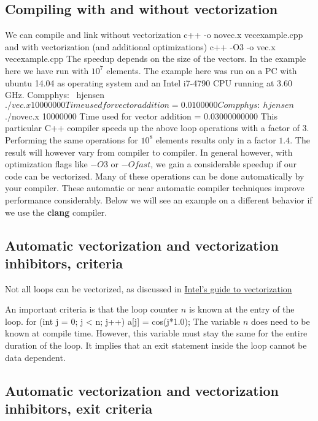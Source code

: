 \documentclass[%
oneside,                 %
final,                   %
10pt]{article}
\begin{document}
\subsection{Compiling with and without vectorization}
We can compile and link without vectorization
\bcppcod
c++ -o novec.x vecexample.cpp
\ecppcod
and with vectorization (and additional optimizations)
\bcppcod
c++ -O3 -o  vec.x vecexample.cpp 
\ecppcod
The speedup depends on the size of the vectors. In the example here we have run with $10^7$ elements.
The example here was run on a PC with ubuntu 14.04 as operating system and an Intel i7-4790 CPU running at 3.60 GHz. 
\bcppcod
Compphys:~ hjensen$ ./vec.x 10000000
Time used  for vector addition = 0.0100000
Compphys:~ hjensen$ ./novec.x 10000000
Time used  for vector addition = 0.03000000000
\ecppcod
This particular C++ compiler speeds up the above loop operations with a factor of 3. 
Performing the same operations for $10^8$ elements results only in a factor $1.4$.
The result will however vary from compiler to compiler. In general however, with optimization flags like $-O3$ or $-Ofast$, we gain a considerable speedup if our code can be vectorized. Many of these operations can be done automatically by your compiler. These automatic or near automatic compiler techniques improve performance considerably.  Below we will see an example on a different behavior if we use the \textbf{clang} compiler.

\subsection{Automatic vectorization and vectorization inhibitors, criteria}

Not all loops can be vectorized, as discussed in \href{{https://software.intel.com/en-us/articles/a-guide-to-auto-vectorization-with-intel-c-compilers}}{Intel's guide to vectorization}

An important criteria is that the loop counter $n$ is known at the entry of the loop.
\bcppcod
  for (int j = 0; j < n; j++) {
    a[j] = cos(j*1.0);
  }
\ecppcod
The variable $n$ does need to be known at compile time. However, this variable must stay the same for the entire duration of the loop. It implies that an exit statement inside the loop cannot be data dependent.

\subsection{Automatic vectorization and vectorization inhibitors, exit criteria}
\end{document}
